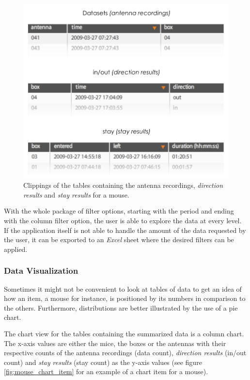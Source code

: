 \begin{figure}[htpb]
\begin{center}
  \includegraphics[width=.75\textwidth]{assets/pdf/overview_data.pdf}
  \caption[Overview of the data sets for mouse]{Clippings of the tables containing the antenna recordings, \textit{direction results} and \textit{stay results} for a mouse.}
  \label{fig:overview_data}
\end{center}
\end{figure}  

With the whole package of filter options, starting with the period and ending with the column filter option, the user is able to explore the data at every level. If the application itself is not able to handle the amount of the data requested by the user, it can be exported to an \textit{Excel} sheet where the desired filters can be applied.       

\subsubsection{Data Visualization}
\label{subsubsec:datavis}

Sometimes it might not be convenient to look at tables of data to get an idea of how an item, a mouse for instance, is positioned by its numbers in comparison to the others. Furthermore, distributions are better illustrated by the use of a pie chart. 

The chart view for the tables containing the summarized data is a column chart. The x-axis values are either the mice, the boxes or the antennas with their respective counts of the antenna recordings (data count), \textit{direction results} (in/out count) and \textit{stay results} (stay count) as the y-axis values (see figure \ref{fig:mouse_chart_item} for an example of a chart item for a mouse). 

